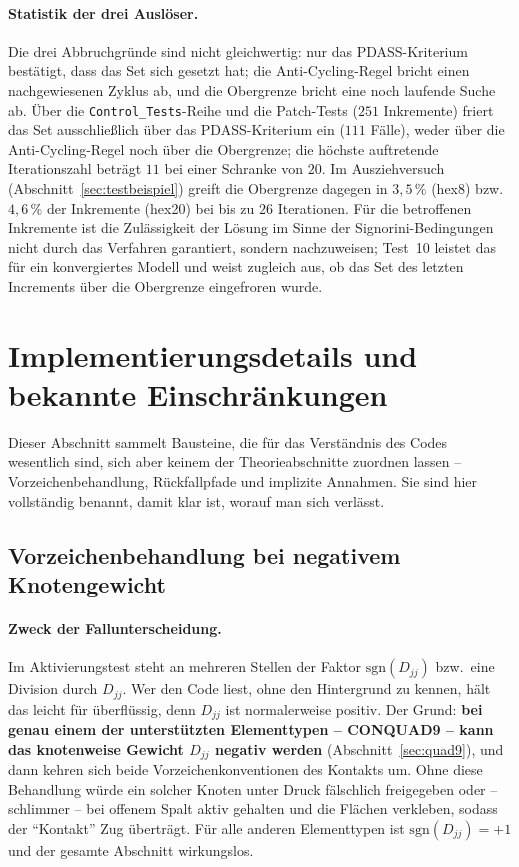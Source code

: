 \documentclass[a4paper,11pt]{article}
\def\tilde#1{#1}%
\newcommand{\file}[1]{\texttt{\small #1}}
\let\stdsection\section
\renewcommand{\section}{\clearpage\stdsection}
\begin{document}
\paragraph{Statistik der drei Auslöser.}
Die drei Abbruchgründe sind nicht gleichwertig: nur das PDASS-Kriterium bestätigt, dass das Set sich
gesetzt hat; die Anti-Cycling-Regel bricht einen nachgewiesenen Zyklus ab, und die Obergrenze bricht
eine noch laufende Suche ab. Über die \file{Control\_Tests}-Reihe und die Patch-Tests ($251$
Inkremente) friert das Set ausschließlich über das PDASS-Kriterium ein ($111$ Fälle), weder über
die Anti-Cycling-Regel noch über die Obergrenze; die höchste auftretende Iterationszahl beträgt
$11$ bei einer Schranke von $20$. Im Ausziehversuch (Abschnitt~\ref{sec:testbeispiel}) greift die
Obergrenze dagegen in $3{,}5\,\%$ (hex8) bzw.\ $4{,}6\,\%$ der Inkremente (hex20) bei bis zu $26$
Iterationen. Für die betroffenen Inkremente ist die Zulässigkeit der Lösung im Sinne der
Signorini-Bedingungen nicht durch das Verfahren garantiert, sondern nachzuweisen; Test~10 leistet
das für ein konvergiertes Modell und weist zugleich aus, ob das Set des letzten Increments über die
Obergrenze eingefroren wurde.

\section{Implementierungsdetails und bekannte Einschränkungen}
\label{sec:implnotes}

Dieser Abschnitt sammelt Bausteine, die für das Verständnis des Codes wesentlich sind, sich aber
keinem der Theorieabschnitte zuordnen lassen -- Vorzeichenbehandlung, Rückfallpfade und implizite
Annahmen. Sie sind hier vollständig benannt, damit klar ist, worauf man sich verlässt.

\subsection{Vorzeichenbehandlung bei negativem Knotengewicht}
\label{sec:sgnd}

\paragraph{Zweck der Fallunterscheidung.}
Im Aktivierungstest steht an mehreren Stellen der Faktor $\mathrm{sgn}(\tilde D_{jj})$ bzw.\ eine
Division durch $\tilde D_{jj}$. Wer den Code liest, ohne den Hintergrund zu kennen, hält das
leicht für überflüssig, denn $\tilde D_{jj}$ ist normalerweise positiv. Der Grund: \textbf{bei
genau einem der unterstützten Elementtypen -- CONQUAD9 -- kann das knotenweise Gewicht
$\tilde D_{jj}$ negativ werden} (Abschnitt~\ref{sec:quad9}), und dann kehren sich beide
Vorzeichenkonventionen des Kontakts um. Ohne diese Behandlung würde ein solcher Knoten unter Druck
fälschlich freigegeben oder -- schlimmer -- bei offenem Spalt aktiv gehalten und die Flächen
verkleben, sodass der ``Kontakt'' Zug überträgt. Für alle anderen Elementtypen ist
$\mathrm{sgn}(\tilde D_{jj})=+1$ und der gesamte Abschnitt wirkungslos.
\end{document}
